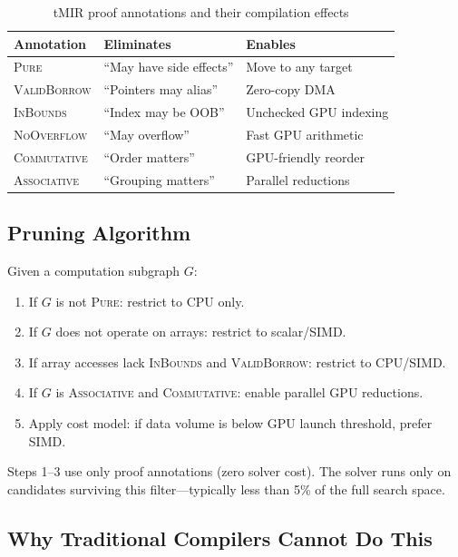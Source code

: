 \documentclass[11pt,twocolumn]{article}
\begin{document}
\begin{table}[h]
\centering
\caption{tMIR proof annotations and their compilation effects}
\label{tab:proofs}
\small
\begin{tabular}{@{}lll@{}}
\toprule
\textbf{Annotation} & \textbf{Eliminates} & \textbf{Enables} \\
\midrule
\textsc{Pure} & ``May have side effects'' & Move to any target \\
\textsc{ValidBorrow} & ``Pointers may alias'' & Zero-copy DMA \\
\textsc{InBounds} & ``Index may be OOB'' & Unchecked GPU indexing \\
\textsc{NoOverflow} & ``May overflow'' & Fast GPU arithmetic \\
\textsc{Commutative} & ``Order matters'' & GPU-friendly reorder \\
\textsc{Associative} & ``Grouping matters'' & Parallel reductions \\
\bottomrule
\end{tabular}
\end{table}

\subsection{Pruning Algorithm}

Given a computation subgraph $G$:

\begin{enumerate}[leftmargin=*,topsep=4pt,itemsep=2pt]
\item If $G$ is not \textsc{Pure}: restrict to CPU only.
\item If $G$ does not operate on arrays: restrict to scalar/SIMD.
\item If array accesses lack \textsc{InBounds} and \textsc{ValidBorrow}: restrict to CPU/SIMD.
\item If $G$ is \textsc{Associative} and \textsc{Commutative}: enable parallel GPU reductions.
\item Apply cost model: if data volume is below GPU launch threshold, prefer SIMD.
\end{enumerate}

Steps 1--3 use only proof annotations (zero solver cost). The solver runs only on candidates surviving this filter---typically less than 5\% of the full search space.

\subsection{Why Traditional Compilers Cannot Do This}
\end{document}
